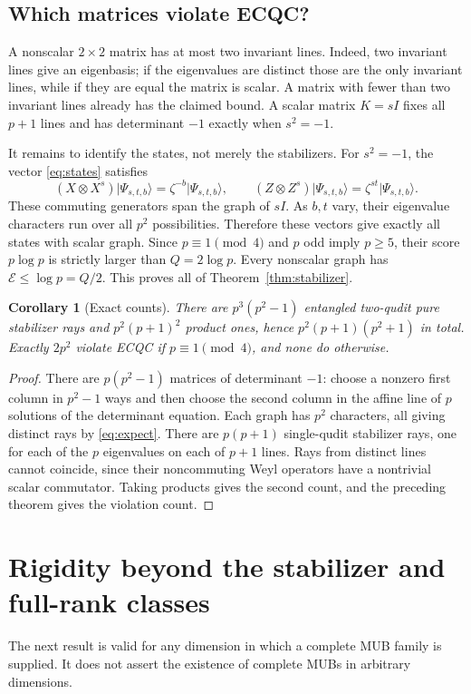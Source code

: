 \documentclass[11pt]{article}
\newtheorem{corollary}[theorem]{Corollary}
\theoremstyle{remark}\newtheorem{remark}[theorem]{Remark}
\newcommand{\E}{\mathcal E}
\newcommand{\ket}[1]{\lvert#1\rangle}
\begin{document}
\subsection{Which matrices violate ECQC?}
A nonscalar $2\times2$ matrix has at most two invariant lines. Indeed, two invariant lines give an eigenbasis; if the eigenvalues are distinct those are the only invariant lines, while if they are equal the matrix is scalar. A matrix with fewer than two invariant lines already has the claimed bound. A scalar matrix $K=sI$ fixes all $p+1$ lines and has determinant $-1$ exactly when $s^2=-1$.

It remains to identify the states, not merely the stabilizers. For $s^2=-1$, the vector \eqref{eq:states} satisfies
\[
 (X\otimes X^s)\ket{\Psi_{s,t,b}}=\zeta^{-b}\ket{\Psi_{s,t,b}},\qquad
 (Z\otimes Z^s)\ket{\Psi_{s,t,b}}=\zeta^{st}\ket{\Psi_{s,t,b}}.
\]
These commuting generators span the graph of $sI$. As $b,t$ vary, their eigenvalue characters run over all $p^2$ possibilities. Therefore these vectors give exactly all states with scalar graph. Since $p\equiv1\pmod4$ and $p$ odd imply $p\ge5$, their score $p\log p$ is strictly larger than $Q=2\log p$. Every nonscalar graph has $\E\le\log p=Q/2$. This proves all of Theorem~\ref{thm:stabilizer}.

\begin{corollary}[Exact counts]\label{cor:counts}
There are $p^3(p^2-1)$ entangled two-qudit pure stabilizer rays and $p^2(p+1)^2$ product ones, hence $p^2(p+1)(p^2+1)$ in total. Exactly $2p^2$ violate ECQC if $p\equiv1\pmod4$, and none do otherwise.
\end{corollary}
\begin{proof}
There are $p(p^2-1)$ matrices of determinant $-1$: choose a nonzero first column in $p^2-1$ ways and then choose the second column in the affine line of $p$ solutions of the determinant equation. Each graph has $p^2$ characters, all giving distinct rays by \eqref{eq:expect}. There are $p(p+1)$ single-qudit stabilizer rays, one for each of the $p$ eigenvalues on each of $p+1$ lines. Rays from distinct lines cannot coincide, since their noncommuting Weyl operators have a nontrivial scalar commutator. Taking products gives the second count, and the preceding theorem gives the violation count.
\end{proof}

\section{Rigidity beyond the stabilizer and full-rank classes}
The next result is valid for any dimension in which a complete MUB family is supplied. It does not assert the existence of complete MUBs in arbitrary dimensions.
\end{document}
